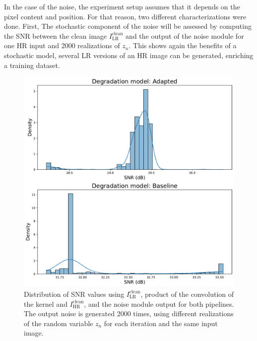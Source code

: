         In the case of the noise, the experiment setup assumes that it depends on the pixel content and position.
        For that reason, two different characterizations were done. 
        First, The stochastic component of the noise will be assessed by computing the SNR between the clean image $I_{\text{LR}}^{\text{clean}}$ and the output of the noise module for one HR input and 2000 realizations of $z_n$.
        This shows again the benefits of a stochastic model, several LR versions of an HR image can be generated, enriching a training dataset.

        
        \begin{figure}[H]
            \centering
            \includegraphics[width=\textwidth]{Includes/5-source-noise-1-sample.pdf}
            \caption{Distribution of SNR values using $I_{\text{LR}}^{\text{clean}}$, product of the convolution of the kernel and $I_{\text{HR}}^{\text{clean}}$, and the noise module output for both pipelines.
                     The output noise is generated 2000 times, using different realizations of the random variable $z_n$ for each iteration and the same input image.
                    }
            \label{fig:5-source-noise-1-sample}
        \end{figure}
        

